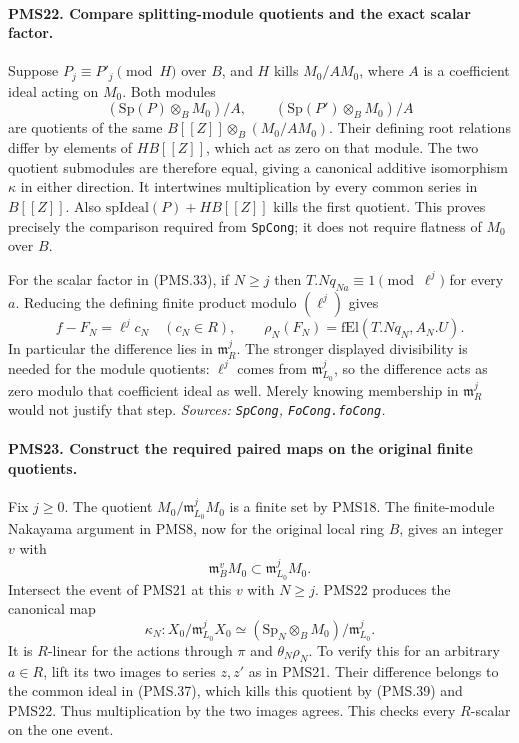 \paragraph{PMS22. Compare splitting-module quotients and the exact scalar factor.}
\label{claim:PMS22}
Suppose $P_j\equiv P'_j\pmod{H}$ over $B$, and $H$ kills
$M_0/AM_0$, where $A$ is a coefficient ideal acting on $M_0$.
Both modules
\[
 (\mathrm{Sp}(P)\otimes_B M_0)/A,\qquad
 (\mathrm{Sp}(P')\otimes_B M_0)/A
\]
are quotients of the same $B[[Z]]\otimes_B(M_0/AM_0)$.
Their defining root relations differ by elements of
$HB[[Z]]$, which act as zero on that module.  The two quotient
submodules are therefore equal, giving a canonical additive
isomorphism $\kappa$ in either direction.
It intertwines multiplication by every common series in
$B[[Z]]$.  Also $\mathrm{spIdeal}(P)+HB[[Z]]$ kills the first
quotient.  This proves precisely the comparison required from
\texttt{SpCong}; it does not require flatness of $M_0$ over $B$.

For the scalar factor in (PMS.33), if $N\geq j$ then
$T.Nq_{Na}\equiv1\pmod{\ell^j}$ for every $a$.
Reducing the defining finite product modulo $(\ell^j)$ gives
\[
 f-F_N=\ell^j c_N\quad(c_N\in R),\qquad
 \rho_N(F_N)=\mathrm{fEl}(T.Nq_N,A_N.U).          \tag{PMS.38}
\]
In particular the difference lies in $\mathfrak m_R^j$.
The stronger displayed divisibility is needed for the module
quotients: $\ell^j$ comes from
$\mathfrak m_{L_0}^j$, so the difference acts as zero modulo
that coefficient ideal as well.  Merely knowing membership
in $\mathfrak m_R^j$ would not justify that step.
\hfill\textit{Sources: \texttt{SpCong}, \texttt{FoCong.foCong}.}

\paragraph{PMS23. Construct the required paired maps on the original finite quotients.}
\label{claim:PMS23}
Fix $j\geq0$.  The quotient
$M_0/\mathfrak m_{L_0}^jM_0$ is a finite set by PMS18.
The finite-module Nakayama argument in PMS8, now for the
original local ring $B$, gives an integer $v$ with
\[
 \mathfrak m_B^vM_0\subset\mathfrak m_{L_0}^jM_0.             \tag{PMS.39}
\]
Intersect the event of PMS21 at this $v$ with $N\geq j$.
PMS22 produces the canonical map
\[
 \kappa_N:X_0/\mathfrak m_{L_0}^jX_0
   \simeq(\mathrm{Sp}_N\otimes_B M_0)/
                        \mathfrak m_{L_0}^j.
\]
It is $R$-linear for the actions through $\pi$ and
$\theta_N\rho_N$.  To verify this for an arbitrary $a\in R$,
lift its two images to series $z,z'$ as in PMS21.
Their difference belongs to the common ideal in (PMS.37),
which kills this quotient by (PMS.39) and PMS22.
Thus multiplication by the two images agrees.  This checks
every $R$-scalar on the one event.

